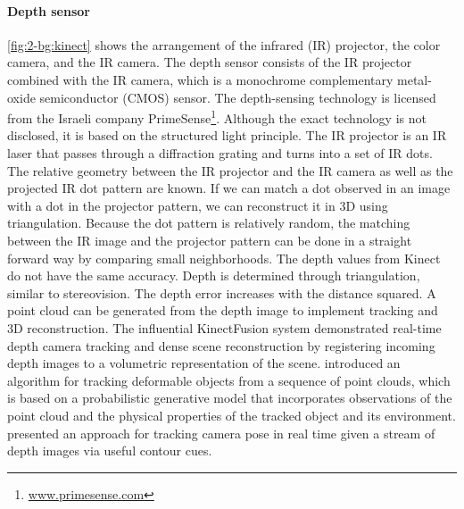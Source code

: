 \paragraph{Depth sensor}
\figurename{\ref{fig:2-bg:kinect}} shows the arrangement of the infrared (IR) projector, the color camera, and the IR camera. The depth sensor consists of the IR projector combined with the IR camera, which is a monochrome complementary metal-oxide semiconductor (CMOS) sensor. The depth-sensing technology is licensed from the Israeli company PrimeSense\footnote{\url{www.primesense.com}}. Although the exact technology is not disclosed, it is based on the structured light principle. The IR projector is an IR laser that passes through a diffraction grating and turns into a set of IR dots. The relative geometry between the IR projector and the IR camera as well as the projected IR dot pattern are known. If we can match a dot observed in an image with a dot in the projector pattern, we can reconstruct it in 3D using triangulation. Because the dot pattern is relatively random, the matching between the IR image and the projector pattern can be done in a straight forward way by comparing small neighborhoods. The depth values from Kinect do not have the same accuracy. Depth is determined through triangulation, similar to stereovision. The depth error increases with the distance squared.
A point cloud can be generated from the depth image to implement tracking and 3D reconstruction. The influential KinectFusion system \cite{Newcombe2011} demonstrated real-time depth camera tracking and dense scene reconstruction by registering incoming depth images to a volumetric representation of the scene. \citet{Schulman2013} introduced an algorithm for tracking deformable objects from a sequence of point clouds, which is based on a probabilistic generative model that incorporates observations of the point cloud and the physical properties of the tracked object and its environment.
\citet{Zhou2015} presented an approach for tracking camera pose in real time given a stream of depth images via useful contour cues.

